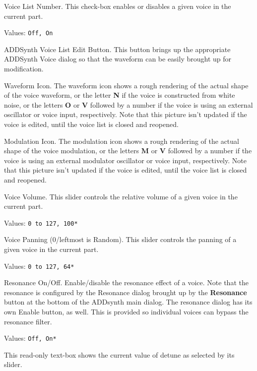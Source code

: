    Voice List Number.
   This check-box enables or disables a given voice in the current part.

   Values: \texttt{Off, On}

   ADDSynth Voice List Edit Button.
   This button brings up the appropriate ADDSynth Voice dialog so that the
   waveform can be easily brought up for modification.

   Waveform Icon.
   The waveform icon shows a rough rendering of the actual shape of the voice
   waveform, or the letter \textbf{N} if the voice is constructed from white
   noise, or the letters \textbf{O} or \textbf{V} followed by a number if the
   voice is using an external oscillator or voice input, respectively.
   Note that this picture isn't updated if the voice is edited, until the voice
   list is closed and reopened.

  Modulation Icon.
  The modulation icon shows a rough rendering of the actual shape of the voice
  modulation, or the letters \textbf{M} or \textbf{V} followed by a number if
  the voice is using an external modulator oscillator or voice input,
  respectively.
  Note that this picture isn't updated if the voice is edited, until the voice
  list is closed and reopened.

   Voice Volume.
   This slider controls the relative volume of a given voice in the current
   part.

   Values: \texttt{0 to 127, 100*}

   Voice Panning (0/leftmost is Random).
   This slider controls the panning of a given voice in the current part.

   Values: \texttt{0 to 127, 64*}

   Resonance On/Off.
   Enable/disable the resonance effect of a voice.
   Note that the resonance is configured by the Resonance dialog brought
   up by the \textbf{Resonance} button at the bottom of the ADDsynth main
   dialog.  The resonance dialog has its own Enable button, as well.
   This is provided so individual voices can bypass the resonance filter.

   Values: \texttt{Off, On*}

   This read-only text-box shows the current value of detune as selected by
   its slider.

